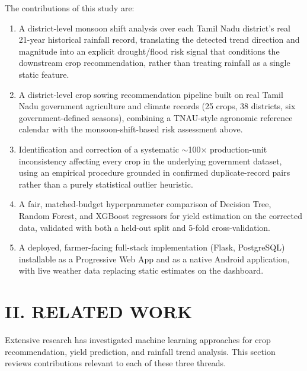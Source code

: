 \documentclass[12pt,a4paper,twocolumn]{article}
\begin{document}
The contributions of this study are:
\begin{enumerate}[label=(\roman*)]
  \item A district-level monsoon shift analysis over each Tamil Nadu district's real
        21-year historical rainfall record, translating the detected trend direction
        and magnitude into an explicit drought/flood risk signal that conditions the
        downstream crop recommendation, rather than treating rainfall as a single
        static feature.
  \item A district-level crop sowing recommendation pipeline built on real Tamil Nadu
        government agriculture and climate records (25 crops, 38 districts, six
        government-defined seasons), combining a TNAU-style agronomic reference
        calendar with the monsoon-shift-based risk assessment above.
  \item Identification and correction of a systematic $\sim$100$\times$
        production-unit inconsistency affecting every crop in the underlying
        government dataset, using an empirical procedure grounded in confirmed
        duplicate-record pairs rather than a purely statistical outlier heuristic.
  \item A fair, matched-budget hyperparameter comparison of Decision Tree, Random
        Forest, and XGBoost regressors for yield estimation on the corrected data,
        validated with both a held-out split and 5-fold cross-validation.
  \item A deployed, farmer-facing full-stack implementation (Flask, PostgreSQL)
        installable as a Progressive Web App and as a native Android application,
        with live weather data replacing static estimates on the dashboard.
\end{enumerate}

\section*{II. RELATED WORK}

Extensive research has investigated machine learning approaches for crop
recommendation, yield prediction, and rainfall trend analysis. This section reviews
contributions relevant to each of these three threads.
\end{document}
